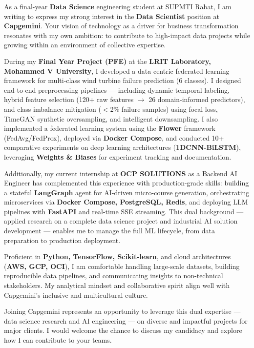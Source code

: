 \documentclass[11pt, a4paper]{awesome-cv}
\begin{document}
\makecvheader[R]
\makelettertitle

\begin{cvletter}

As a final-year \textbf{Data Science} engineering student at SUPMTI Rabat, I am writing to express my strong interest in the \textbf{Data Scientist} position at \textbf{Capgemini}. Your vision of technology as a driver for business transformation resonates with my own ambition: to contribute to high-impact data projects while growing within an environment of collective expertise.

During my \textbf{Final Year Project (PFE)} at the \textbf{LRIT Laboratory, Mohammed V University}, I developed a data-centric federated learning framework for multi-class wind turbine failure prediction (6 classes). I designed end-to-end preprocessing pipelines — including dynamic temporal labeling, hybrid feature selection (120+ raw features $\rightarrow$ 26 domain-informed predictors), and class imbalance mitigation ($<$2\% failure samples) using focal loss, TimeGAN synthetic oversampling, and intelligent downsampling. I also implemented a federated learning system using the \textbf{Flower} framework (FedAvg/FedProx), deployed via \textbf{Docker Compose}, and conducted 10+ comparative experiments on deep learning architectures (\textbf{1DCNN-BiLSTM}), leveraging \textbf{Weights \& Biases} for experiment tracking and documentation.

Additionally, my current internship at \textbf{OCP SOLUTIONS} as a Backend AI Engineer has complemented this experience with production-grade skills: building a stateful \textbf{LangGraph} agent for AI-driven micro-course generation, orchestrating microservices via \textbf{Docker Compose, PostgreSQL, Redis}, and deploying LLM pipelines with \textbf{FastAPI} and real-time SSE streaming. This dual background — applied research on a complete data science project and industrial AI solution development — enables me to manage the full ML lifecycle, from data preparation to production deployment.

Proficient in \textbf{Python, TensorFlow, Scikit-learn}, and cloud architectures (\textbf{AWS, GCP, OCI}), I am comfortable handling large-scale datasets, building reproducible data pipelines, and communicating insights to non-technical stakeholders. My analytical mindset and collaborative spirit align well with Capgemini's inclusive and multicultural culture.

Joining Capgemini represents an opportunity to leverage this dual expertise — data science research and AI engineering — on diverse and impactful projects for major clients. I would welcome the chance to discuss my candidacy and explore how I can contribute to your teams.

\end{cvletter}

\makeletterclosing
\end{document}
